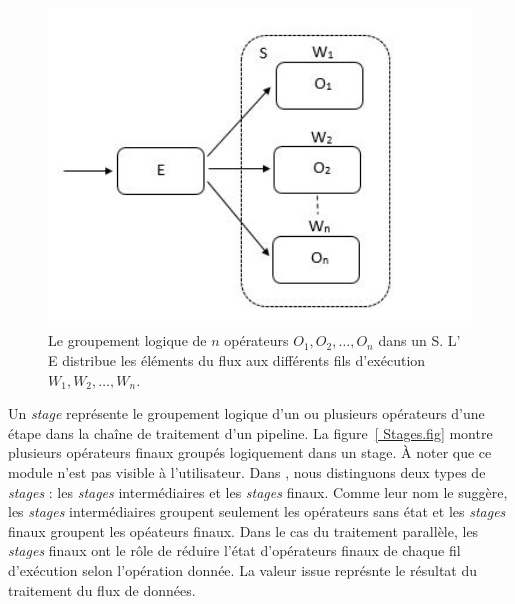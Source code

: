 
\begin{figure}[ht]
\centering
     \includegraphics[width=1.0\textwidth]{Figures/Stages.jpg}
      \caption[Le groupement logique de $n$ op\'erateurs $O_1, O_2, \ldots, O_n$ dans un  S.]{Le groupement logique de $n$ op\'erateurs $O_1, O_2, \ldots, O_n$ dans un  S.  L' E distribue les \'el\'ements du flux aux diff\'erents fils d'ex\'ecution $W_1, W_2, \ldots, W_n$.}
       \label{Stages.fig}
\end{figure}

Un \emph{stage} repr\'esente le groupement logique d'un ou plusieurs op\'erateurs d'une \'etape dans la cha\^ine de traitement d'un pipeline. La figure~\ref{ Stages.fig} montre plusieurs op\'erateurs finaux group\'es logiquement dans un stage.  \`A noter que ce module n'est pas visible \`a l'utilisateur. Dans , nous distinguons deux types de \emph{stages} : les \emph{stages} interm\'ediaires et les \emph{stages} finaux. Comme leur nom le sugg\`ere, les \emph{stages} interm\'ediaires groupent seulement les op\'erateurs sans \'etat et les \emph{stages} finaux groupent les op\'eateurs finaux. Dans le cas du traitement parall\`ele, les \emph{stages} finaux ont le r\^ole de r\'eduire l'\'etat d'op\'erateurs finaux de chaque fil d'ex\'ecution selon l'op\'eration donn\'ee. La valeur issue repr\'esnte le r\'esultat du traitement du flux de donn\'ees.



